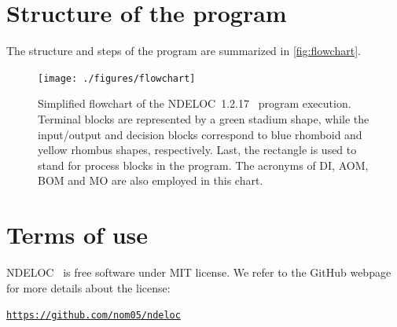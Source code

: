 \documentclass[a4paper,11pt,openany]{memoir}
\newcommand\versionprog{1.2.17}
\newcommand\programa{\textsc{NDELOC}}
\begin{document}
\section{Structure of the program}
The structure and steps of the program are summarized in \autoref{fig:flowchart}.

\begin{figure}
	\begin{center}
		\texttt{[image: ./figures/flowchart]}
		\caption{Simplified flowchart of the \programa~\versionprog~ program execution. Terminal blocks are represented by a green stadium shape, while the input/output and decision blocks correspond to blue rhomboid and yellow rhombus shapes, respectively. Last, the rectangle is used to stand for process blocks in the program. The acronyms of \acf{DI}, \acf{AOM}, \acf{BOM} and \acf{MO} are also employed in this chart.}\label{fig:flowchart}
	\end{center}

\end{figure}

\section{Terms of use}
\programa~ is free software under MIT license. We refer to the GitHub webpage for more details about the license:
\begin{center}
	\texttt{\url{https://github.com/nom05/ndeloc}}
\end{center}
\end{document}
